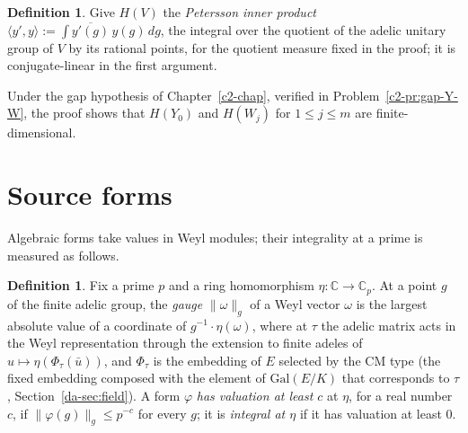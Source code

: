 \documentclass[reqno]{amsart}
\newcounter{chap}
\theoremstyle{plain}
\theoremstyle{definition}
\newtheorem{definition}[theorem]{Definition}
\newcommand{\C}{{\mathbb{C}}}
\begin{document}
\begin{definition}\label{def:petersson}
Give \(H(V)\) the \emph{Petersson inner product} \(\langle y', y\rangle := \int \overline{y'(g)}\,y(g)\,dg\), the integral over the quotient of the adelic unitary group of \(V\) by its rational points, for the quotient measure fixed in the proof; it is conjugate-linear in the first argument.
\end{definition}

Under the gap hypothesis of Chapter~\ref{c2-chap}, verified in Problem~\ref{c2-pr:gap-Y-W}, the proof shows that \(H(Y_0)\) and \(H(W_j)\) for \(1 \le j \le m\) are finite-dimensional.

\section{Source forms}\label{sec:source}

Algebraic forms take values in Weyl modules; their integrality at a prime is measured as follows.

\begin{definition}\label{def:gauge}
Fix a prime \(p\) and a ring homomorphism \(\eta\colon \C \to \C_p\).  At a point \(g\) of the finite adelic group, the \emph{gauge} \(\lVert\omega\rVert_g\) of a Weyl vector \(\omega\) is the largest absolute value of a coordinate of \(g^{-1}\cdot\eta(\omega)\), where at \(\tau\) the adelic matrix acts in the Weyl representation through the extension to finite adeles of \(u \mapsto \eta(\Phi_\tau(\bar u))\), and \(\Phi_\tau\) is the embedding of \(E\) selected by the CM type (the fixed embedding composed with the element of \(\mathrm{Gal}(E/K)\) that corresponds to \(\tau\), Section~\ref{da-sec:field}).  A form \(\varphi\) \emph{has valuation at least \(c\)} at \(\eta\), for a real number \(c\), if \(\lVert\varphi(g)\rVert_g \le p^{-c}\) for every \(g\); it is \emph{integral at \(\eta\)} if it has valuation at least \(0\).
\end{definition}
\end{document}
